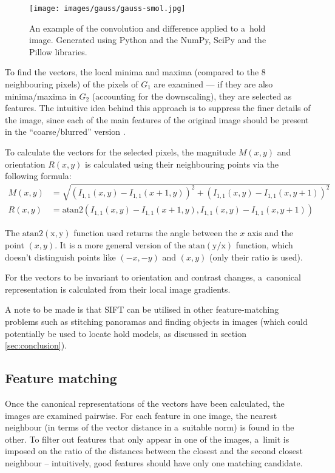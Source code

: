\begin{figure}
	\centering
	\texttt{[image: images/gauss/gauss-smol.jpg]}
	\caption{An example of the convolution and difference applied to a~hold image. Generated using Python and the NumPy, SciPy and the Pillow libraries.}
	\label{fig:gaussexample}
\end{figure}

To find the vectors, the local minima and maxima (compared to the 8 neighbouring pixels) of the pixels of $G_1$ are examined --- if they are also minima/maxima in $G_2$ (accounting for the downscaling), they are selected as features.
The intuitive idea behind this approach is to suppress the finer details of the image, since each of the main features of the original image should be present in the ``coarse/blurred'' version \cite{scalespace}.

To calculate the vectors for the selected pixels, the magnitude $M(x,y)$ and orientation $R(x,y)$ is calculated using their neighbouring points via the following formula:
\begin{align}
	M(x,y) &= \sqrt{\left(I_{1,1}(x, y) - I_{1,1}(x + 1, y)\right)^2 + \left(I_{1,1}(x,y) - I_{1,1}(x, y + 1)\right)^2} \\[0.7em]
	R(x,y) &= \mathrm{atan2} \left(I_{1,1}(x, y) - I_{1,1}(x + 1, y), I_{1,1}(x,y) - I_{1,1}(x, y + 1)\right)
\end{align}

The $\mathrm{atan2(x, y)}$ function used returns the angle between the $x$ axis and the point $(x, y)$.
It is a more general version of the $\mathrm{atan(y/x)}$ function, which doesn't distinguish points like $(-x, -y)$ and $(x, y)$ (only their ratio is used).

For the vectors to be invariant to orientation and contrast changes, a~canonical representation is calculated from their local image gradients.

A note to be made is that SIFT can be utilised in other feature-matching problems such as stitching panoramas and finding objects in images (which could potentially be used to locate hold models, as discussed in section \ref{sec:conclusion}).

\subsection{Feature matching}
Once the canonical representations of the vectors have been calculated, the images are examined pairwise.
For each feature in one image, the nearest neighbour (in terms of the vector distance in a~suitable norm) is found in the other.
To filter out features that only appear in one of the images, a~limit is imposed on the ratio of the distances between the closest and the second closest neighbour -- intuitively, good features should have only one matching candidate.

